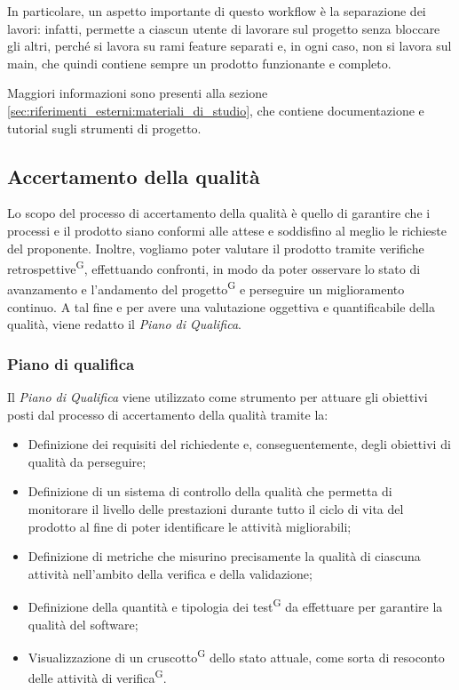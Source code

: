 In particolare, un aspetto importante di questo workflow è la separazione dei lavori: infatti, permette a ciascun utente di lavorare sul progetto senza bloccare gli altri, perché si lavora su rami feature separati e, in ogni caso, non si lavora sul main, che quindi contiene sempre un prodotto funzionante e completo.
\par Maggiori informazioni sono presenti alla sezione \ref{sec:riferimenti_esterni:materiali_di_studio}, che contiene documentazione e tutorial sugli strumenti di progetto.


\subsection{Accertamento della qualità}\label{sec:processi_di_supporto:accertamento_qualità}
Lo scopo del processo di accertamento della qualità è quello di garantire che i processi e il prodotto siano conformi alle attese e soddisfino al meglio le richieste del proponente. 
Inoltre, vogliamo poter valutare il prodotto tramite verifiche retrospettive\textsuperscript{G}, effettuando confronti, in modo da poter osservare lo stato di avanzamento e l'andamento del progetto\textsuperscript{G} e perseguire un miglioramento continuo.
A tal fine e per avere una valutazione oggettiva e quantificabile della qualità, viene redatto il \textit{Piano di Qualifica}. %

\subsubsection{Piano di qualifica}
Il \textit{Piano di Qualifica} 
viene utilizzato come strumento per attuare gli obiettivi posti dal processo di accertamento della qualità tramite la:
\begin{itemize}
    \item Definizione dei requisiti del richiedente e, conseguentemente, degli obiettivi di qualità da perseguire;
    \item Definizione di un sistema di controllo della qualità che permetta di monitorare il livello delle prestazioni durante tutto il ciclo di vita del prodotto al fine di poter identificare le attività migliorabili;
    \item Definizione di metriche che misurino precisamente la qualità di ciascuna attività nell'ambito della verifica e della validazione;
    \item Definizione della quantità e tipologia dei test\textsuperscript{G} da effettuare per garantire la qualità del software;
    \item Visualizzazione di un cruscotto\textsuperscript{G} dello stato attuale, come sorta di resoconto delle attività di verifica\textsuperscript{G}.
\end{itemize}

